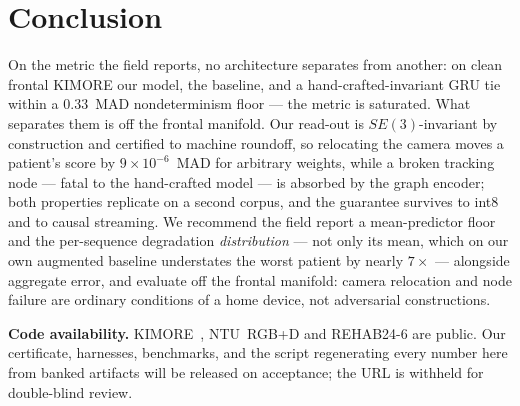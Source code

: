\documentclass[10pt,twocolumn,letterpaper]{article}
\begin{document}
\section{Conclusion}\label{sec:conclusion}
On the metric the field reports, no architecture separates from another: on clean frontal KIMORE our
model, the baseline, and a hand-crafted-invariant GRU tie within a $0.33$~MAD nondeterminism floor --- the
metric is saturated. What separates them is off the frontal manifold. Our read-out is $SE(3)$-invariant by construction and
certified to machine roundoff, so relocating the camera moves a patient's score by $9\times10^{-6}$~MAD
for arbitrary weights, while a broken tracking node --- fatal to the hand-crafted model --- is absorbed
by the graph encoder; both properties replicate on a second corpus, and the guarantee survives to int8
and to causal streaming. We recommend the field report a mean-predictor floor and the per-sequence
degradation \emph{distribution} --- not only its mean, which on our own augmented baseline understates
the worst patient by nearly $7\times$ --- alongside aggregate error, and evaluate off the frontal
manifold: camera relocation and node failure are ordinary conditions of a home device, not adversarial
constructions.

\noindent\textbf{Code availability.} KIMORE~\cite{capecci2019kimore}, NTU~RGB+D and REHAB24-6 are
public. Our certificate, harnesses, benchmarks, and the script regenerating every number here from
banked artifacts will be released on acceptance; the URL is withheld for double-blind review.
\end{document}

